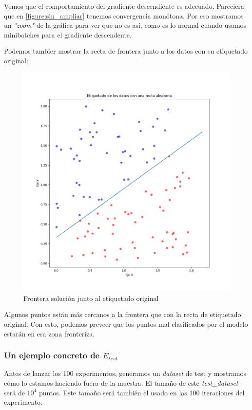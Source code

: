 \documentclass[11pt]{article}
\begin{document}
Vemos que el comportamiento del gradiente descendiente es adecuado. Pareciera que en \ref{figure:sin_ampliar} tenemos convergencia monótona. Por eso mostramos un \emph{"zoom"} de la gráfica para ver que no es así, como es lo normal cuando usamos minibatches para el gradiente descendente.

Podemos tambier mostrar la recta de frontera junto a los datos con su etiquetado original:

\begin{figure}[H]
    \centering
    \includegraphics[scale=0.35]{frontera_resultado_lgr}
    \caption{Frontera solución junto al etiquetado original}
\end{figure}

Algunos puntos están más cercanos a la frontera que con la recta de etiquetado original. Con esto, podemos preveer que los puntos mal clasificados por el modelo estarán en esa zona fronteriza.

\subsubsection{Un ejemplo concreto de $E_{test}$}

Antes de lanzar los 100 experimentos, generamos un \emph{dataset} de test y mostramos cómo lo estamos haciendo fuera de la muestra. El tamaño de este \emph{test\_dataset} será de $10^4$ puntos. Este tamaño será también el usado en las 100 iteraciones del experimento.
\end{document}
